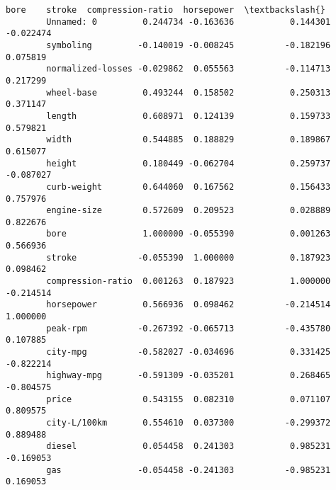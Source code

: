 \documentclass[11pt]{article}
\begin{document}
\begin{Verbatim}[commandchars=\\\{\}]
                               bore    stroke  compression-ratio  horsepower  \textbackslash{}
        Unnamed: 0         0.244734 -0.163636           0.144301   -0.022474   
        symboling         -0.140019 -0.008245          -0.182196    0.075819   
        normalized-losses -0.029862  0.055563          -0.114713    0.217299   
        wheel-base         0.493244  0.158502           0.250313    0.371147   
        length             0.608971  0.124139           0.159733    0.579821   
        width              0.544885  0.188829           0.189867    0.615077   
        height             0.180449 -0.062704           0.259737   -0.087027   
        curb-weight        0.644060  0.167562           0.156433    0.757976   
        engine-size        0.572609  0.209523           0.028889    0.822676   
        bore               1.000000 -0.055390           0.001263    0.566936   
        stroke            -0.055390  1.000000           0.187923    0.098462   
        compression-ratio  0.001263  0.187923           1.000000   -0.214514   
        horsepower         0.566936  0.098462          -0.214514    1.000000   
        peak-rpm          -0.267392 -0.065713          -0.435780    0.107885   
        city-mpg          -0.582027 -0.034696           0.331425   -0.822214   
        highway-mpg       -0.591309 -0.035201           0.268465   -0.804575   
        price              0.543155  0.082310           0.071107    0.809575   
        city-L/100km       0.554610  0.037300          -0.299372    0.889488   
        diesel             0.054458  0.241303           0.985231   -0.169053   
        gas               -0.054458 -0.241303          -0.985231    0.169053   
        

\end{Verbatim}
\end{document}
